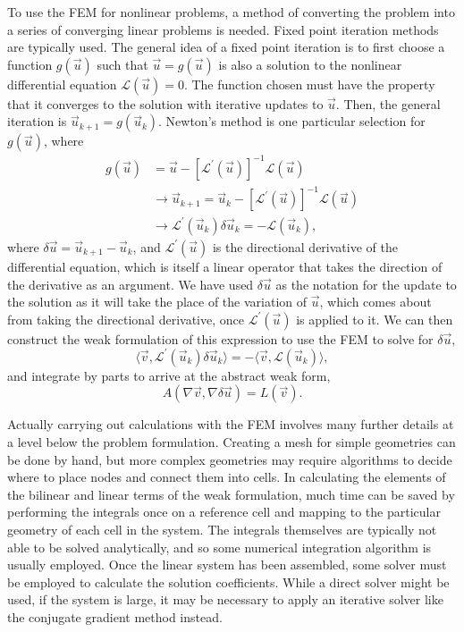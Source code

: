 To use the \ac{FEM} for nonlinear problems, a method of converting the problem into a series of converging linear problems is needed.
Fixed point iteration methods are typically used.
The general idea of a fixed point iteration is to first choose a function $g(\vec{u})$ such that $\vec{u} = g(\vec{u})$ is also a solution to the nonlinear differential equation $\mathcal{L}(\vec{u}) = 0$.
The function chosen must have the property that it converges to the solution with iterative updates to $\vec{u}$.
Then, the general iteration is $\vec{u}_{k + 1} = g(\vec{u}_{k})$.
Newton's method is one particular selection for $g(\vec{u})$, where
\begin{align}
    g(\vec{u}) &= \vec{u} - [\mathcal{L}^{'}(\vec{u})]^{-1} \mathcal{L}(\vec{u}) \nonumber\\
               &\longrightarrow \vec{u}_{k + 1} = \vec{u}_{k} - [\mathcal{L}^{'}(\vec{u})]^{-1} \mathcal{L}(\vec{u}) \nonumber\\
               &\longrightarrow \mathcal{L}^{'}(\vec{u}_{k}) \delta \vec{u}_{k} = - \mathcal{L}(\vec{u}_{k}),
\end{align}
where $\delta \vec{u} = \vec{u}_{k + 1} - \vec{u}_{k}$, and $\mathcal{L}^{'}(\vec{u})$ is the directional derivative of the differential equation, which is itself a linear operator that takes the direction of the derivative as an argument.
We have used $\delta \vec{u}$ as the notation for the update to the solution as it will take the place of the variation of $\vec{u}$, which comes about from taking the directional derivative, once $\mathcal{L}^{'}(\vec{u})$ is applied to it.
We can then construct the weak formulation of this expression to use the \ac{FEM} to solve for $\delta \vec{u}$,
\begin{equation}
    \langle \vec{v}, \mathcal{L}^{'}(\vec{u}_{k}) \delta \vec{u}_{k} \rangle = - \langle \vec{v}, \mathcal{L}(\vec{u}_{k}) \rangle,
\end{equation}
and integrate by parts to arrive at the abstract weak form,
\begin{equation}
    A(\nabla \vec{v}, \nabla \delta \vec{u}) = L(\vec{v}).
\end{equation}

Actually carrying out calculations with the \ac{FEM} involves many further details at a level below the problem formulation.
Creating a mesh for simple geometries can be done by hand, but more complex geometries may require algorithms to decide where to place nodes and connect them into cells.
In calculating the elements of the bilinear and linear terms of the weak formulation, much time can be saved by performing the integrals once on a reference cell and mapping to the particular geometry of each cell in the system.
The integrals themselves are typically not able to be solved analytically, and so some numerical integration algorithm is usually employed.
Once the linear system has been assembled, some solver must be employed to calculate the solution coefficients.
While a direct solver might be used, if the system is large, it may be necessary to apply an iterative solver like the conjugate gradient method instead.

